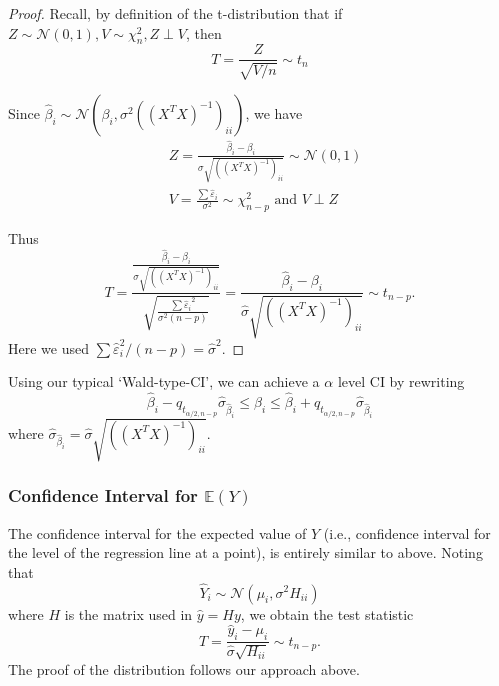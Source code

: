 \documentclass[11pt, %
	oneside, %
	english, %
	onehalfspacing, %
	]{article} %
\numberwithin{equation}{section}
\begin{document}
\begin{proof}
    Recall, by definition of the t-distribution that if $Z \sim \mathcal{N}(0,1), V \sim \chi^2_n, Z \perp V$, then
    $$
    T = \frac{Z}{\sqrt{ V / n }} \sim t_n
    $$

    Since $\hat{\beta}_i \sim \mathcal{N} (\beta_i, \sigma^2 \left( (X^TX)^{-1} \right)_{ii})$, we have
    $$
    \begin{aligned}
    &Z = \frac{\hat{\beta}_i - \beta_i}{\sigma \sqrt{ \left( (X^TX)^{-1} \right)_{ii} }} \sim \mathcal{N}(0,1) \\
    &V = \frac{\sum \hat{\varepsilon}_i}{\sigma^2} \sim \chi^2_{n-p} \text{ and } V \perp Z
    \end{aligned}
    $$

    Thus
    $$
    T = \frac{\frac{\hat{\beta}_i - \beta_i}{\sigma \sqrt{ \left( (X^TX)^{-1} \right)_{ii} }}}{\sqrt{\frac{\sum {\hat{\varepsilon}_i}^{2}}{\sigma^2(n-p)}} } = \frac{\hat{\beta}_i - \beta_i}{\hat{\sigma} \sqrt{ \left( \left( X^T X \right)^{-1}   \right)_{ii}  }} \sim t_{n-p}.
    $$
    Here we used $\sum \hat{\varepsilon}_i^2 / (n-p) = \hat{\sigma}^2$.
\end{proof}

Using our typical `Wald-type-CI', we can achieve a $\alpha$ level CI by rewriting
\begin{equation*}
    \hat{\beta}_i - q_{t_{\alpha/2, n-p}} \hat{\sigma}_{\hat{\beta}_i} \leq \beta_i \leq \hat{\beta}_i + q_{t_{\alpha /2, n-p}} \hat{\sigma}_{\hat{\beta}_i}
\end{equation*}
where $\hat{\sigma}_{\hat{\beta}_i} = \hat{\sigma} \sqrt{ \left( \left( X^T X \right)^{-1}   \right)_{ii} }$.


\subsubsection*{Confidence Interval for $\mathbb{E}(Y)$}

The confidence interval for the expected value of $Y$ (i.e., confidence interval for the level of the regression line at a point), is entirely similar to above. Noting that
\begin{equation*}
    \hat{Y}_i \sim \mathcal{N}(\mu_i, \sigma^2 H_{ii})
\end{equation*}
where $H$ is the matrix used in $\hat{y} = Hy$, we obtain the test statistic
\begin{equation*}
    T = \frac{\hat{y}_i - \mu_i}{\hat{\sigma} \sqrt{H_{ii}}} \sim t_{n-p}.
\end{equation*}
The proof of the distribution follows our approach above.
\end{document}
